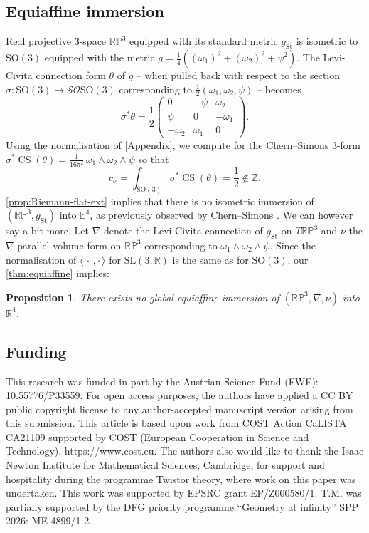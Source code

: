 \documentclass[british,11pt,a4paper]{amsart}
\numberwithin{equation}{section}
\newcommand{\B}[2]{\langle#1,#2\rangle}
\newcommand{\CS}{\operatorname{CS}}
\newcommand{\Z}{\mathbb{Z}}
\newcommand*{\R}{\mathbb{R}}
\newcounter{theorem}
\numberwithin{theorem}{section}
\newtheorem{prop}[theorem]{Proposition}
\theoremstyle{definition}
\theoremstyle{remark}
\begin{document}
\subsection{Equiaffine immersion}

Real projective $3$-space $\mathbb{RP}^3$ equipped with its standard metric $g_{\mathrm{St}}$ is isometric to $\mathrm{SO}(3)$ equipped with the metric $g=\tfrac{1}{4}\left((\omega_1)^2+(\omega_2)^2+\psi^2\right)$. The Levi-Civita connection form $\theta$ of $g$ -- when pulled back with respect to the section $\sigma : \mathrm{SO}(3) \to \mathcal{SO}\mathrm{SO}(3)$ corresponding to $\tfrac{1}{2}(\omega_1,\omega_2,\psi)$ -- becomes
\[
\sigma^*\theta=\frac{1}{2}\begin{pmatrix} 0 & -\psi & \omega_2 \\ \psi & 0 & -\omega_1 \\ -\omega_2 & \omega_1 & 0 \end{pmatrix}.
\]
Using the normalisation of \cref{Appendix}, we compute for the Chern--Simons $3$-form $\sigma^*\CS(\theta)=\tfrac{1}{16\pi^2}\,\omega_1\wedge\omega_2\wedge\psi$ so that
\[
c_{\sigma}=\int_{\mathrm{SO}(3)}\sigma^*\CS(\theta)=\frac{1}{2} \notin \Z.
\]
\cref{prop:Riemann-flat-ext} implies that there is no isometric immersion of $(\mathbb{RP}^3,g_{\mathrm{St}})$ into $\mathbb{E}^4$, as previously observed by Chern--Simons \cite{MR0353327}. We can however say a bit more. Let $\nabla$ denote the Levi-Civita connection of $g_{\mathrm{St}}$ on $T\mathbb{RP}^3$ and $\nu$ the $\nabla$-parallel volume form on $\mathbb{RP}^3$ corresponding to $\omega_1\wedge\omega_2\wedge\psi$. Since the normalisation of $\B{\,\cdot\,}{\cdot\,}$ for $\mathrm{SL}(3,\R)$ is the same as for $\mathrm{SO}(3)$, our \cref{thm:equiaffine} implies:
\begin{prop}
There exists no global equiaffine immersion of $(\mathbb{RP}^3,\nabla,\nu)$ into $\R^4$. 
\end{prop}

\subsection*{Funding} This research was funded in part by the Austrian Science Fund
(FWF): 10.55776/P33559. For open access purposes, the authors have applied a CC BY
public copyright license to any author-accepted manuscript version arising from this
submission.  This article is based upon work from COST Action CaLISTA CA21109
supported by COST (European Cooperation in Science and
Technology). https://www.cost.eu. The authors also would like to thank the Isaac
Newton Institute for Mathematical Sciences, Cambridge, for support and hospitality
during the programme Twistor theory, where work on this paper was undertaken. This
work was supported by EPSRC grant EP/Z000580/1. T.M. was partially supported by the
DFG priority programme ``Geometry at infinity'' SPP 2026: ME 4899/1-2.
\end{document}
